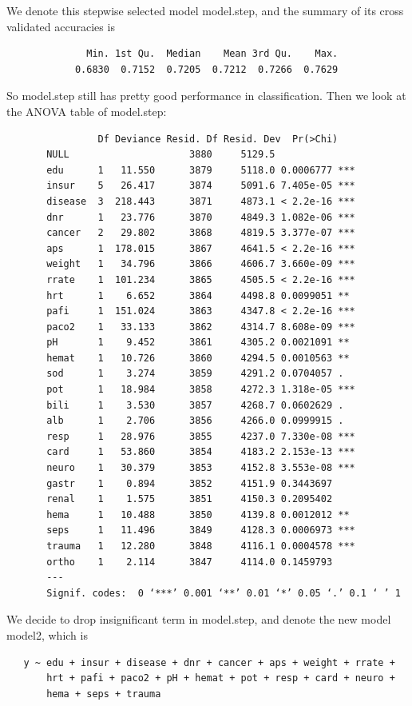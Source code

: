 \documentclass{article}
\begin{document}
We denote this stepwise selected model model.step, and the summary of its cross validated accuracies is
\begin{verbatim}
              Min. 1st Qu.  Median    Mean 3rd Qu.    Max. 
            0.6830  0.7152  0.7205  0.7212  0.7266  0.7629 
\end{verbatim}
So model.step still has pretty good performance in classification. Then we look at the ANOVA table of model.step:
\begin{verbatim}
                Df Deviance Resid. Df Resid. Dev  Pr(>Chi)    
       NULL                     3880     5129.5              
       edu      1   11.550      3879     5118.0 0.0006777 ***
       insur    5   26.417      3874     5091.6 7.405e-05 ***
       disease  3  218.443      3871     4873.1 < 2.2e-16 ***
       dnr      1   23.776      3870     4849.3 1.082e-06 ***
       cancer   2   29.802      3868     4819.5 3.377e-07 ***
       aps      1  178.015      3867     4641.5 < 2.2e-16 ***
       weight   1   34.796      3866     4606.7 3.660e-09 ***
       rrate    1  101.234      3865     4505.5 < 2.2e-16 ***
       hrt      1    6.652      3864     4498.8 0.0099051 ** 
       pafi     1  151.024      3863     4347.8 < 2.2e-16 ***
       paco2    1   33.133      3862     4314.7 8.608e-09 ***
       pH       1    9.452      3861     4305.2 0.0021091 ** 
       hemat    1   10.726      3860     4294.5 0.0010563 ** 
       sod      1    3.274      3859     4291.2 0.0704057 .  
       pot      1   18.984      3858     4272.3 1.318e-05 ***
       bili     1    3.530      3857     4268.7 0.0602629 .  
       alb      1    2.706      3856     4266.0 0.0999915 .  
       resp     1   28.976      3855     4237.0 7.330e-08 ***
       card     1   53.860      3854     4183.2 2.153e-13 ***
       neuro    1   30.379      3853     4152.8 3.553e-08 ***
       gastr    1    0.894      3852     4151.9 0.3443697    
       renal    1    1.575      3851     4150.3 0.2095402    
       hema     1   10.488      3850     4139.8 0.0012012 ** 
       seps     1   11.496      3849     4128.3 0.0006973 ***
       trauma   1   12.280      3848     4116.1 0.0004578 ***
       ortho    1    2.114      3847     4114.0 0.1459793    
       ---
       Signif. codes:  0 ‘***’ 0.001 ‘**’ 0.01 ‘*’ 0.05 ‘.’ 0.1 ‘ ’ 1
 \end{verbatim} 

We decide to drop insignificant term in model.step, and denote the new model model2, which is
\begin{verbatim}
   y ~ edu + insur + disease + dnr + cancer + aps + weight + rrate + 
       hrt + pafi + paco2 + pH + hemat + pot + resp + card + neuro + 
       hema + seps + trauma
\end{verbatim}
\end{document}
